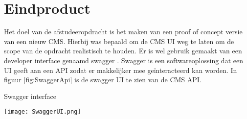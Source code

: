 \section{Eindproduct}
Het doel van de afstudeeropdracht is het maken van een proof of concept versie van een nieuw CMS.
Hierbij was bepaald om de CMS UI weg te laten om de scope van de opdracht realistisch te houden.
Er is wel gebruik gemaakt van een developer interface genaamd swagger \parencite{Swagger}.
Swagger is een softwareoplossing dat een UI geeft aan een API zodat er makkelijker mee geïnteracteerd kan worden.
In figuur \ref{fig:SwaggerApi} is de swagger UI te zien van de CMS API.

\whitespace
\begin{graphic}
    \captionsetup{type=figure}
    \caption{Swagger interface}
    \texttt{[image: SwaggerUI.png]}
    \label{fig:SwaggerApi}
\end{graphic}




